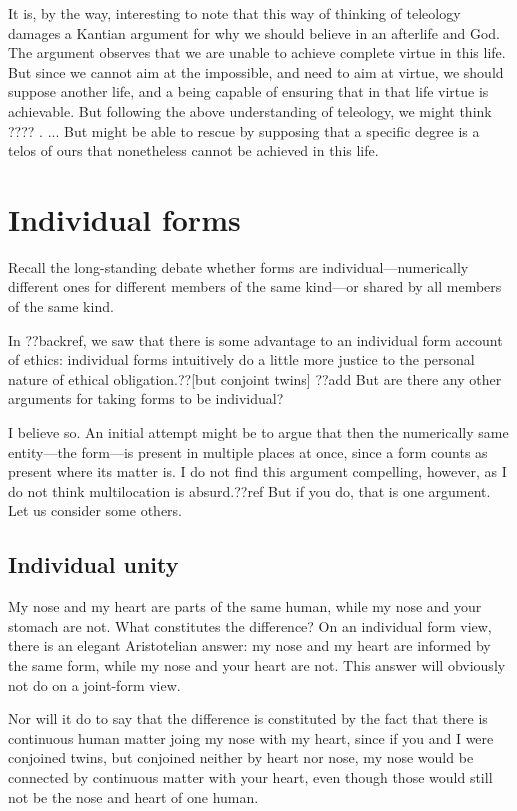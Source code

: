 It is, by the way, interesting to note that this way of thinking of teleology damages a Kantian argument for why we should believe in 
an afterlife and God. The argument observes that we are unable to achieve complete virtue in this life. But since we cannot aim at
the impossible, and need to aim at virtue, we should suppose another life, and a being capable of ensuring that in that life virtue
is achievable. But following the above understanding of teleology, we might think ???? . ... But might be able to rescue by supposing
that a specific degree is a telos of ours that nonetheless cannot be achieved in this life.

\section{Individual forms}
Recall the long-standing debate whether forms are individual---numerically different ones for different members of the same kind---or shared
by all members of the same kind.

In ??backref, we saw that there is some advantage to an individual form account of ethics: individual forms intuitively do 
a little more justice to the personal nature of ethical obligation.??[but conjoint twins] ??add 
But are there any other arguments for taking forms to be individual?

I believe so. An initial attempt might be to argue that then the numerically same entity---the form---is present in multiple
places at once, since a form counts as present where its matter is. I do not find this argument compelling, however, as I do not 
think multilocation is absurd.??ref But if you do, that is one argument. Let us consider some others.

\subsection{Individual unity}
My nose and my heart are parts of the same human, while my nose and your stomach are not. What constitutes the 
difference? On an individual form view, there is an elegant Aristotelian answer: my nose and my heart are informed by the same
form, while my nose and your heart are not. This answer will obviously not do on a joint-form view.

Nor will it do to say that the difference is constituted by the fact that there is continuous human matter joing my nose with my
heart, since if you and I were conjoined twins, but conjoined neither by heart nor nose, my nose would be connected by continuous
matter with your heart, even though those would still not be the nose and heart of one human. 


